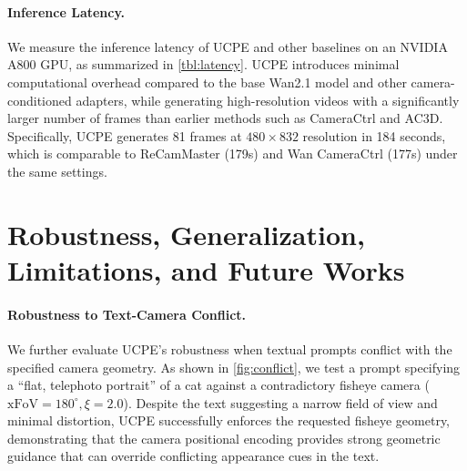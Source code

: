 \paragraph{Inference Latency.}
We measure the inference latency of UCPE and other baselines on an NVIDIA A800 GPU, as summarized in \cref{tbl:latency}. 
UCPE introduces minimal computational overhead compared to the base Wan2.1 model and other camera-conditioned adapters, while generating high-resolution videos with a significantly larger number of frames than earlier methods such as CameraCtrl and AC3D. 
Specifically, UCPE generates 81 frames at $480 \times 832$ resolution in 184 seconds, which is comparable to ReCamMaster (179s) and Wan CameraCtrl (177s) under the same settings.

\begin{table}[t]
    \centering
    \caption{
        \textbf{Inference latency comparison.}
        Latencies are measured on a single NVIDIA A800 GPU, with corresponding frame counts and resolutions provided for reference.
    }\label{tbl:latency}
    \vspace{-0.5em}
\end{table}

\section{Robustness, Generalization, Limitations, and Future Works}
\label{sec:limitation}

\paragraph{Robustness to Text-Camera Conflict.}
We further evaluate UCPE's robustness when textual prompts conflict with the specified camera geometry.
As shown in \cref{fig:conflict}, we test a prompt specifying a ``flat, telephoto portrait'' of a cat against a contradictory fisheye camera (\(\textrm{xFoV} = 180^\circ, \xi = 2.0\)).
Despite the text suggesting a narrow field of view and minimal distortion, UCPE successfully enforces the requested fisheye geometry, demonstrating that the camera positional encoding provides strong geometric guidance that can override conflicting appearance cues in the text.

